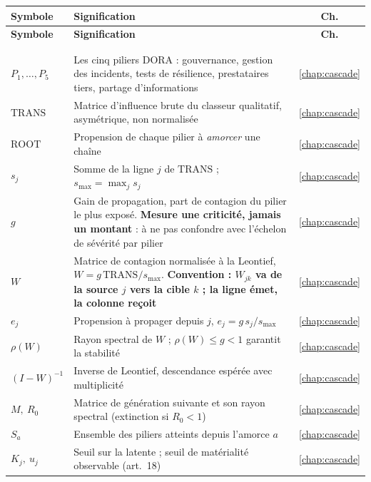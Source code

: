 {\small
\begin{longtable}{>{\raggedright}p{3.3cm} >{\raggedright\arraybackslash}p{10.2cm} c}
\toprule
\rowcolor{lightblue}
\textbf{Symbole} & \textbf{Signification} & \textbf{Ch.} \\
\midrule
\endfirsthead
\toprule
\rowcolor{lightblue}
\textbf{Symbole} & \textbf{Signification} & \textbf{Ch.} \\
\midrule
\endhead
\bottomrule
\multicolumn{3}{r@{}}{\footnotesize\itshape suite page suivante} \\
\endfoot
\bottomrule
\endlastfoot
\multicolumn{3}{@{}l}{\emph{\textcolor{navy}{Piliers et cascade dirigée}}} \\
$P_1,\dots,P_5$ & Les cinq piliers DORA : gouvernance, gestion des incidents, tests de résilience, prestataires tiers, partage d'informations & \ref{chap:cascade} \\
$\mathrm{TRANS}$ & Matrice d'influence brute du classeur qualitatif, asymétrique, non normalisée & \ref{chap:cascade} \\
$\mathrm{ROOT}$ & Propension de chaque pilier à \emph{amorcer} une chaîne & \ref{chap:cascade} \\
$s_j$ & Somme de la ligne $j$ de $\mathrm{TRANS}$ ; $s_{\max}=\max_j s_j$ & \ref{chap:cascade} \\
$g$ & Gain de propagation, part de contagion du pilier le plus exposé. \textbf{Mesure une criticité, jamais un montant} : à ne pas confondre avec l'échelon de sévérité par pilier & \ref{chap:cascade} \\
$W$ & Matrice de contagion normalisée à la Leontief, $W=g\,\mathrm{TRANS}/s_{\max}$. \textbf{Convention : $W_{jk}$ va de la source $j$ vers la cible $k$ ; la ligne émet, la colonne reçoit} & \ref{chap:cascade} \\
$e_j$ & Propension à propager depuis $j$, $e_j=g\,s_j/s_{\max}$ & \ref{chap:cascade} \\
$\rho(W)$ & Rayon spectral de $W$ ; $\rho(W)\le g<1$ garantit la stabilité & \ref{chap:cascade} \\
$(I-W)^{-1}$ & Inverse de Leontief, descendance espérée avec multiplicité & \ref{chap:cascade} \\
$M,\ R_0$ & Matrice de génération suivante et son rayon spectral (extinction si $R_0<1$) & \ref{chap:cascade} \\
$S_a$ & Ensemble des piliers atteints depuis l'amorce $a$ & \ref{chap:cascade} \\
$K_j,\ u_j$ & Seuil sur la latente ; seuil de matérialité observable (art.~18) & \ref{chap:cascade} \\

\end{longtable}}
